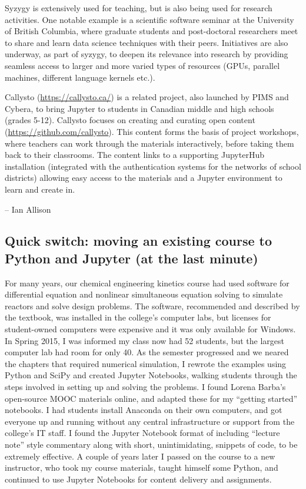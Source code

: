 \documentclass[]{book}
\begin{document}
Syzygy is extensively used for teaching, but is also being used for
research activities. One notable example is a scientific software
seminar at the University of British Columbia, where graduate students
and post-doctoral researchers meet to share and learn data science
techniques with their peers. Initiatives are also underway, as part of
syzygy, to deepen its relevance into research by providing seamless
access to larger and more varied types of resources (GPUs, parallel
machines, different language kernels etc.).

Callysto (\url{https://callysto.ca/}) is a related project, also
launched by PIMS and Cybera, to bring Jupyter to students in Canadian
middle and high schools (grades 5-12). Callysto focuses on creating and
curating open content (\url{https://github.com/callysto}). This content
forms the basis of project workshops, where teachers can work through
the materials interactively, before taking them back to their
classrooms. The content links to a supporting JupyterHub installation
(integrated with the authentication systems for the networks of school
districts) allowing easy access to the materials and a Jupyter
environment to learn and create in.

-- Ian Allison

\subsection{Quick switch: moving an existing course to Python and
Jupyter (at the last
minute)}\label{quick-switch-moving-an-existing-course-to-python-and-jupyter-at-the-last-minute}

For many years, our chemical engineering kinetics course had used
software for differential equation and nonlinear simultaneous equation
solving to simulate reactors and solve design problems. The software,
recommended and described by the textbook, was installed in the
college's computer labs, but licenses for student-owned computers were
expensive and it was only available for Windows. In Spring 2015, I was
informed my class now had 52 students, but the largest computer lab had
room for only 40. As the semester progressed and we neared the chapters
that required numerical simulation, I rewrote the examples using Python
and SciPy and created Jupyter Notebooks, walking students through the
steps involved in setting up and solving the problems. I found Lorena
Barba's open-source MOOC materials online, and adapted these for my
``getting started'' notebooks. I had students install Anaconda on their
own computers, and got everyone up and running without any central
infrastructure or support from the college's IT staff. I found the
Jupyter Notebook format of including ``lecture note'' style commentary
along with short, unintimidating, snippets of code, to be extremely
effective. A couple of years later I passed on the course to a new
instructor, who took my course materials, taught himself some Python,
and continued to use Jupyter Notebooks for content delivery and
assignments.
\end{document}
